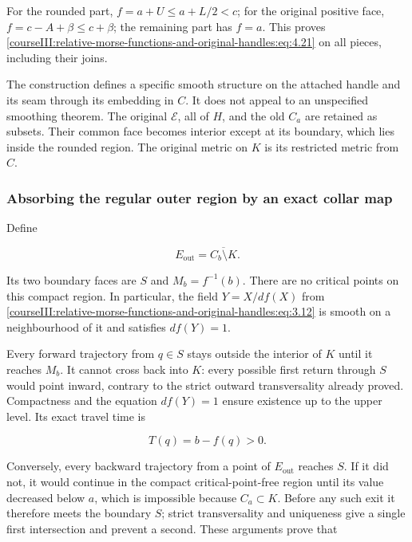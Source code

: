 For the rounded part, \(f=a+U\leq a+L/2<c\); for the original positive face, \(f=c-A+\beta\leq c+\beta\); the remaining part has \(f=a\). This proves \eqref{courseIII:relative-morse-functions-and-original-handles:eq:4.21} on all pieces, including their joins.

The construction defines a specific smooth structure on the attached handle and its seam through its embedding in \(C\). It does not appeal to an unspecified smoothing theorem. The original \(\mathcal E\), all of \(H\), and the old \(C_a\) are retained as subsets. Their common face becomes interior except at its boundary, which lies inside the rounded region. The original metric on \(K\) is its restricted metric from \(C\).

\subsubsection{Absorbing the regular outer region by an exact collar map}
\label{courseIII:relative-morse-functions-and-original-handles:section-4.3}

Define

\begin{equation}
E_{\mathrm{out}}=\overline{C_b\setminus K}.
\label{courseIII:relative-morse-functions-and-original-handles:eq:4.22}
\end{equation}

Its two boundary faces are \(S\) and \(M_b=f^{-1}(b)\). There are no critical points on this compact region. In particular, the field \(Y=X/df(X)\) from \eqref{courseIII:relative-morse-functions-and-original-handles:eq:3.12} is smooth on a neighbourhood of it and satisfies \(df(Y)=1\).

Every forward trajectory from \(q\in S\) stays outside the interior of \(K\) until it reaches \(M_b\). It cannot cross back into \(K\): every possible first return through \(S\) would point inward, contrary to the strict outward transversality already proved. Compactness and the equation \(df(Y)=1\) ensure existence up to the upper level. Its exact travel time is

\begin{equation}
T(q)=b-f(q)>0.
\label{courseIII:relative-morse-functions-and-original-handles:eq:4.23}
\end{equation}

Conversely, every backward trajectory from a point of \(E_{\mathrm{out}}\) reaches \(S\). If it did not, it would continue in the compact critical-point-free region until its value decreased below \(a\), which is impossible because \(C_a\subset K\). Before any such exit it therefore meets the boundary \(S\); strict transversality and uniqueness give a single first intersection and prevent a second. These arguments prove that

